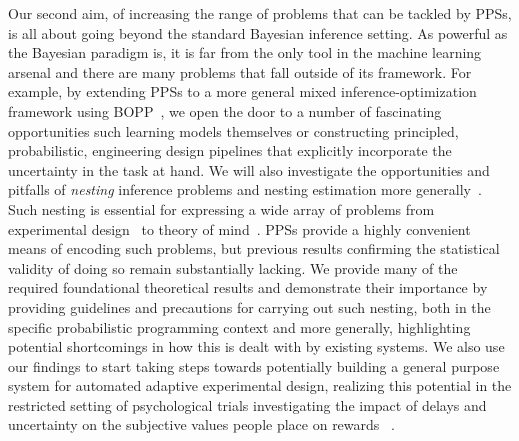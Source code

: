 Our second aim, of increasing the range of problems that can be tackled by PPSs, is all about
going beyond the standard Bayesian inference setting.  As powerful as the Bayesian paradigm is,
it is far from the only tool in the machine learning arsenal and there are many problems that fall
outside of its framework.  For example, by extending PPSs to a more general mixed
inference-optimization framework using BOPP~\cite{rainforth2016bayesian}, we open the door to
a number of fascinating opportunities such learning models themselves or constructing
principled, probabilistic, engineering design pipelines that explicitly incorporate
the uncertainty in the task at hand.  We will also investigate the opportunities and pitfalls
of \emph{nesting} inference problems and nesting estimation more
generally~\citep{rainforth2017pitfalls}.  Such nesting is essential for expressing a wide array
of problems from experimental design~\citep{chaloner1995bayesian} to
theory of mind~\citep{stuhlmuller2014reasoning}.  PPSs provide a highly convenient means
of encoding such problems, but previous results confirming the statistical validity of doing
so remain substantially lacking.  We provide many of the required foundational theoretical results and
demonstrate their importance by providing guidelines and precautions for carrying out such nesting,
both in the specific probabilistic programming context and more generally, highlighting potential
shortcomings in how this is dealt with by existing systems.  We also use our findings to start
taking steps towards potentially building a general purpose system for automated adaptive
experimental design, realizing this potential in the restricted setting of psychological trials
investigating the impact of delays and uncertainty on the subjective values people place
on rewards~\citep{vincent2017darc} .